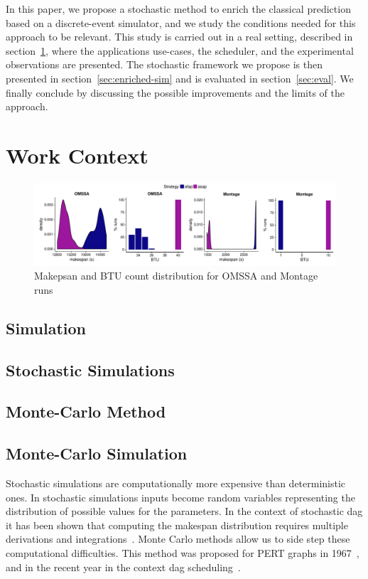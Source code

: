 \documentclass[10pt,conference,compsocconf]{IEEEtran}
\begin{document}
In this paper, we propose a stochastic method to enrich the classical prediction
based on a discrete-event simulator, and  we study the conditions needed for this
approach to be relevant. This study is  carried out in a real setting, described
in  section~\ref{sec:work-context},   where  the  applications   use-cases,  the
scheduler, and  the  experimental  observations are  presented.  The  stochastic
framework we propose is  then presented in section~\ref{sec:enriched-sim} and
is evaluated in section~\ref{sec:eval}. We finally conclude by discussing the 
possible improvements and the limits of the approach.


\section{Work Context}
\label{sec:work-context}
\begin{figure}
	\centering
	\includegraphics[width=\textwidth]{gfx/real_plot.pdf}
	\caption{Makepsan and BTU count distribution for OMSSA and Montage
	runs\label{fig:realbrs}}
\end{figure}

\subsection{Simulation}

\subsection{Stochastic Simulations}

\subsection{Monte-Carlo Method}
\subsection{Monte-Carlo Simulation}\label{sec:MCS}

Stochastic  simulations are  computationally more  expensive than  deterministic
ones. In stochastic simulations inputs  become random variables representing the
distribution of possible values for the parameters. In the context of stochastic
\ac{dag} it has  been shown that computing the  makespan distribution requires
multiple derivations and  integrations~\cite{Ludwig01,Li97}. Monte Carlo methods
allow us to side step these computational difficulties. This method was proposed
for PERT  graphs in 1967~\cite{Slyke63}, and  in the recent year  in the context
\ac{dag} scheduling~\cite{Canon10,Zheng13}.
\end{document}
